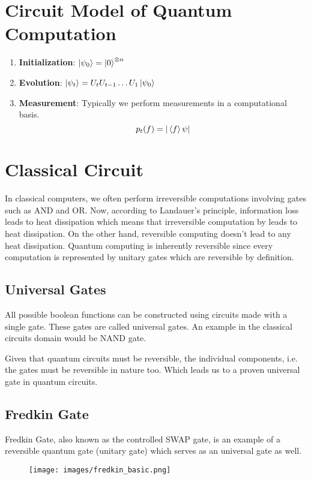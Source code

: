 \documentclass[11.5pt, paper=a4]{article}
\theoremstyle{definition}
\numberwithin{theorem}{section}
\begin{document}
\section{Circuit Model of Quantum Computation}
\begin{enumerate}
    \item \textbf{Initialization}: $\ket{\psi_0} = \ket{0}^{\otimes n}$
    \item \textbf{Evolution}: $\ket{\psi_t} = U_tU_{t-1}\ldots U_1\ket{\psi_0}$
    \item \textbf{Measurement}: Typically we perform measurements in a computational basis. $$p_t(f) = \vert \braket{f}{\psi} \vert$$
\end{enumerate}

\section{Classical Circuit}

In classical computers, we often perform irreversible computations involving gates such as AND and OR. Now, according to Landauer's principle, information loss leads to heat dissipation which means that irreversible computation by leads to heat dissipation.\newline
On the other hand, reversible computing doesn't lead to any heat dissipation. Quantum computing is inherently reversible since every computation is represented by unitary gates which are reversible by definition.

\subsection{Universal Gates}
All possible boolean functions can be constructed using circuits made with a single gate. These gates are called universal gates. An example in the classical circuits domain would be NAND gate.

Given that quantum circuits must be reversible, the individual components, i.e. the gates must be reversible in nature too. Which leads us to a proven universal gate in quantum circuits.


\subsection{Fredkin Gate}
Fredkin Gate, also known as the controlled SWAP gate, is an example of a reversible quantum gate (unitary gate) which serves as an universal gate as well.
\begin{figure}[H]
    \centering
    \texttt{[image: images/fredkin\_basic.png]}
    \label{fig:my_label}
\end{figure}
\end{document}
